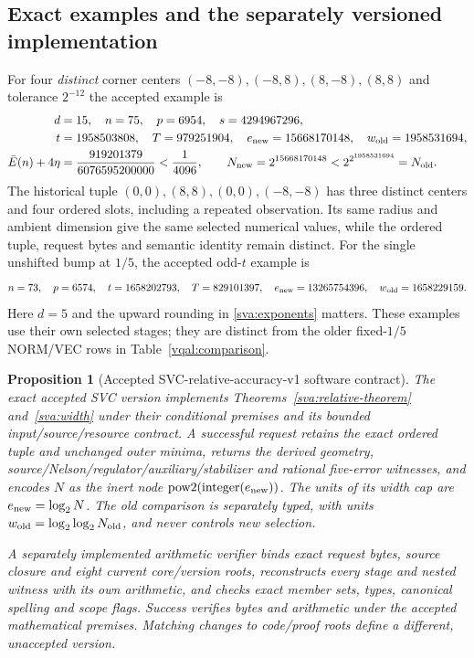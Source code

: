 \documentclass[11pt]{article}
\theoremstyle{plain}
\newtheorem{proposition}[theorem]{Proposition}
\theoremstyle{definition}
\theoremstyle{remark}
\begin{document}
\subsection{Exact examples and the separately versioned implementation}
\label{sva:examples}

For four \emph{distinct} corner centers $(-8,-8),(-8,8),(8,-8),(8,8)$
and tolerance $2^{-12}$ the accepted example is
\begin{align}\label{sva:corner-example}
 d&=15,\quad n=75,\quad p=6954,\quad s=4294967296,\nonumber\\
 t&=1958503808,\quad T=979251904,\quad
 e_{\rm new}=15668170148,\quad w_{\rm old}=1958531694,\nonumber\\
 \bar E(n)+4\eta&={919201379\over6076595200000}<{1\over4096},
 \qquad N_{\rm new}=2^{15668170148}<2^{2^{1958531694}}=N_{\rm old}.
\end{align}
The historical tuple $(0,0),(8,8),(0,0),(-8,-8)$ has three distinct
centers and four ordered slots, including a repeated observation. Its
same radius and ambient dimension give the same selected numerical
values, while the ordered tuple, request bytes and semantic identity
remain distinct.
For the single unshifted bump at $1/5$, the accepted odd-$t$ example is
\begin{equation}\label{sva:odd-example}
 n=73,\quad p=6574,\quad t=1658202793,\quad T=829101397,
 \quad e_{\rm new}=13265754396,\quad w_{\rm old}=1658229159.
\end{equation}
Here $d=5$ and the upward rounding in \eqref{sva:exponents} matters.
These examples use their own selected stages; they are distinct from the
older fixed-$1/5$ NORM/VEC rows in Table~\ref{vqal:comparison}.

\begin{proposition}[Accepted SVC-relative-accuracy-v1 software contract]
\label{sva:software}
The exact accepted SVC version implements Theorems~\ref{sva:relative-theorem}
and~\ref{sva:width} under their conditional premises and its bounded
input/source/resource contract. A successful request retains the exact
ordered tuple and unchanged outer minima, returns the derived geometry,
source/Nelson/regulator/auxiliary/stabilizer and rational five-error
witnesses, and encodes $N$ as the inert node
$\operatorname{pow2}(\operatorname{integer}(e_{\rm new}))$.
The units of its width cap are $e_{\rm new}=\log_2N$.
The old comparison is separately typed, with units
$w_{\rm old}=\log_2\log_2N_{\rm old}$, and never controls new selection.

A separately implemented arithmetic verifier binds exact request bytes,
source closure and eight current core/version roots, reconstructs every
stage and nested witness with its own arithmetic, and checks exact
member sets, types, canonical spelling and scope flags. Success verifies
bytes and arithmetic under the accepted mathematical premises. Matching
changes to code/proof roots define a different, unaccepted version.
\end{proposition}
\end{document}
